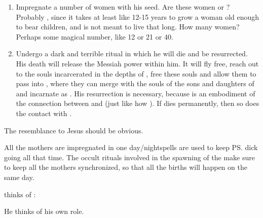 \begin{enumerate}
  \item
    Impregnate a number of women with his seed. 
    \subitem
      Are these women \nephilim{} or \humans{}? 
      Probably \nephilim, since it takes at least like 12-15 years to grow a \human{} woman old enough to bear children, and \Thanatzil{} is not meant to live that long.
    \subitem
      How many women? 
      Perhaps some magical number, like 12 or 21 or 40.
  \item 
    Undergo a dark and terrible ritual in which he will die and be resurrected. 
    \subitem
      His death will release the Messiah power within him. 
      It will fly free, reach out to the \bane{} souls incarcerated in the depths of \Nyx, free these souls and allow them to pass into \Miith{}, where they can merge with the souls of \nephilim{}\dash the sons and daughters of \Thanatzil \dash and incarnate as \resphain. 
    \subitem
      His resurrection is necessary, because \Thanatzil{} is an embodiment of the connection between \Miith{} and \Nyx{} (just like how ). 
      If \Thanatzil{} dies permanently, then so does the contact with \Daggerrain. 
\end{enumerate}

The resemblance to Jesus should be obvious. 

All the mothers are impregnated in one day/night\dash spells are used to keep \ps{\Thanatzil}{} dick going all that time. 
The occult rituals involved in the spawning of the \resphain{} make sure to keep all the mothers synchronized, so that all the births will happen on the same day. 

\Thanatzil{} thinks of \Erebos: 


He thinks of his own role. 


